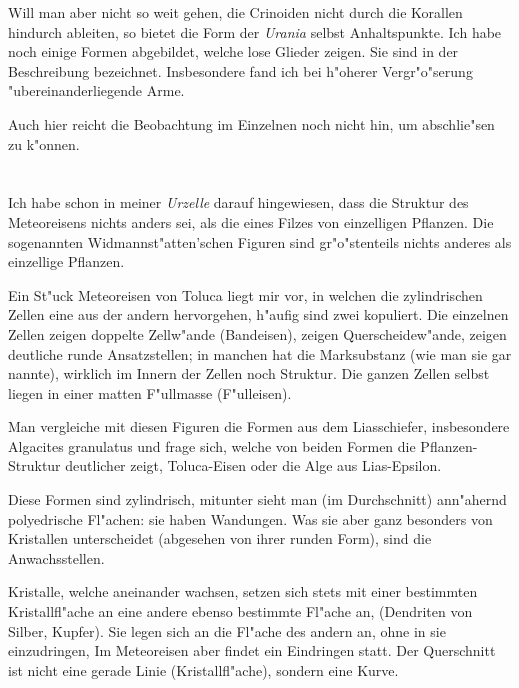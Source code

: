 \documentclass[a4paper, 11pt, oneside]{article}
\begin{document}
Will man aber nicht so weit gehen, die Crinoiden nicht durch die Korallen hindurch ableiten, so bietet die Form der \emph{Urania} selbst Anhaltspunkte. Ich habe noch einige Formen abgebildet, welche lose Glieder zeigen. Sie sind in der Beschreibung bezeichnet. Insbesondere fand ich bei h"oherer Vergr"o"serung "ubereinanderliegende Arme.

Auch hier reicht die Beobachtung im Einzelnen noch nicht hin, um abschlie"sen zu k"onnen.
\clearpage
\section{}
\paragraph{}
Ich habe schon in meiner \emph{Urzelle} darauf hingewiesen, dass die Struktur des Meteoreisens nichts anders sei, als die eines Filzes von einzelligen Pflanzen. Die sogenannten Widmannst"atten'schen Figuren sind gr"o"stenteils nichts anderes als einzellige Pflanzen.

Ein St"uck Meteoreisen von Toluca liegt mir vor, in welchen die zylindrischen Zellen eine aus der andern hervorgehen, h"aufig sind zwei kopuliert. Die einzelnen Zellen zeigen doppelte Zellw"ande (Bandeisen), zeigen Querscheidew"ande, zeigen deutliche runde Ansatzstellen; in manchen hat die Marksubstanz (wie man sie gar nannte), wirklich im Innern der Zellen noch Struktur. Die ganzen Zellen selbst liegen in einer matten F"ullmasse (F"ulleisen).

Man vergleiche mit diesen Figuren die Formen aus dem Liasschiefer, insbesondere Algacites granulatus und frage sich, welche von beiden Formen die Pflanzen-Struktur deutlicher zeigt, Toluca-Eisen oder die Alge aus Lias-Epsilon.

Diese Formen sind zylindrisch, mitunter sieht man (im Durchschnitt) ann"ahernd polyedrische Fl"achen: sie haben Wandungen. Was sie aber ganz besonders von Kristallen unterscheidet (abgesehen von ihrer runden Form), sind die Anwachsstellen.

Kristalle, welche aneinander wachsen, setzen sich stets mit einer bestimmten Kristallfl"ache an eine andere ebenso bestimmte Fl"ache an, (Dendriten von Silber, Kupfer). Sie legen sich an die Fl"ache des andern an, ohne in sie einzudringen, Im Meteoreisen aber findet ein Eindringen statt. Der Querschnitt ist nicht eine gerade Linie (Kristallfl"ache), sondern eine Kurve.
\end{document}
